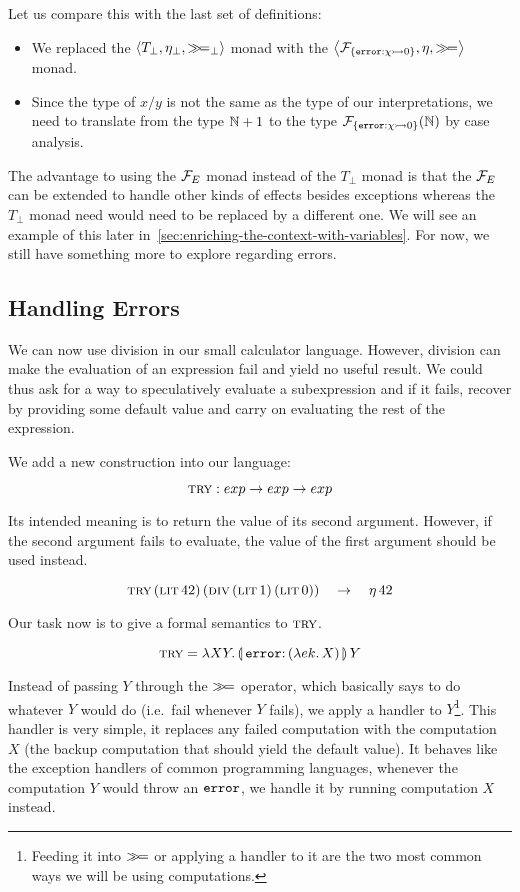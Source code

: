 Let us compare this with the last set of definitions:

\begin{itemize}
\item We replaced the $\left< T_\bot, \eta_\bot, \mathbin{\gg\!=}_\bot \right>$ monad
  with the $\left< \mathcal{F}_{\{\mathtt{error} : \chi \rightarrowtail 0\}}, \eta, \mathbin{\gg\!=} \right>$ monad.
\item Since the type of $x / y$ is not the same as the type of our
  interpretations, we need to translate from the type $\mathbb{N} + 1$ to the type
  $\mathcal{F}_{\{\mathtt{error} : \chi \rightarrowtail 0\}}(\mathbb{N})$ by case analysis.
\end{itemize}

The advantage to using the $\mathcal{F}_E$ monad instead of the $T_\bot$ monad is
that the $\mathcal{F}_E$ can be extended to handle other kinds of effects besides
exceptions whereas the $T_\bot$ monad need would need to be replaced by a
different one. We will see an example of this later
in~\ref{sec:enriching-the-context-with-variables}. For now, we still have
something more to explore regarding errors.

\subsection{Handling Errors}

We can now use division in our small calculator language. However, division
can make the evaluation of an expression fail and yield no useful
result. We could thus ask for a way to speculatively evaluate a
subexpression and if it fails, recover by providing some default value and
carry on evaluating the rest of the expression.

We add a new construction into our language:

$$
\textsc{try} : exp \to exp \to exp
$$

Its intended meaning is to return the value of its second
argument. However, if the second argument fails to evaluate, the value of
the first argument should be used instead.

$$
\textsc{try}\,(\textsc{lit}\,42)\,(\textsc{div}\,(\textsc{lit}\,1)\,(\textsc{lit}\,0))
\quad \to \quad \eta\,42
$$

Our task now is to give a formal semantics to $\textsc{try}$.

$$
\trye = \lam{X Y}{\ap{\banana{\onto{\op{error}}{(\lam{e k}{X})}}}{Y}}
$$

Instead of passing $Y$ through the $\mathbin{\gg\!=}$ operator, which basically says
to do whatever $Y$ would do (i.e.\ fail whenever $Y$ fails), we apply a
handler to $Y$\footnote{Feeding it into $\mathbin{\gg\!=}$ or applying a handler to
  it are the two most common ways we will be using computations.}. This
handler is very simple, it replaces any failed computation with the
computation $X$ (the backup computation that should yield the default
value). It behaves like the exception handlers of common programming
languages, whenever the computation $Y$ would throw an $\mathtt{error}$, we
handle it by running computation $X$ instead.

